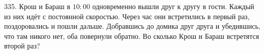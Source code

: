 335. Крош и Бараш в $10:00$ одновременно вышли друг к другу в гости. Каждый из них идёт с постоянной скоростью. Через час они встретились в первый раз, поздоровались и пошли дальше. Добравшись до домика друг друга и убедившись, что там никого нет, оба повернули обратно. Во сколько Крош и Бараш встретятся второй раз?\\
